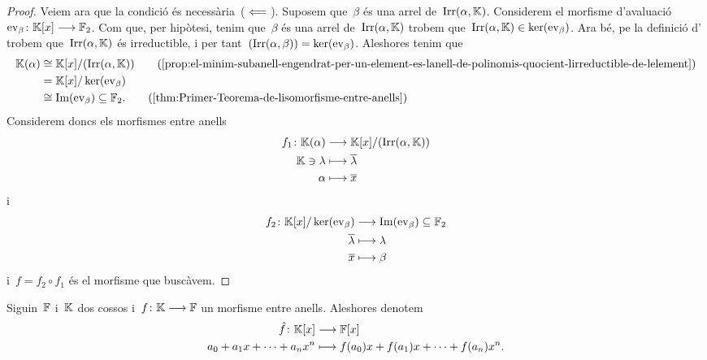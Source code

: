 \documentclass[../teoria-de-Galois.tex]{subfiles}
\begin{document}
\begin{proof}
        Veiem ara que la condició és necessària~(\(\impliedby\)).
        Suposem que~\(\beta\) és una arrel de~\(\operatorname{Irr}(\alpha,\mathbb{K})\).
        Considerem el morfisme d'avaluació~\(\mathrm{ev}_{\beta}\colon\mathbb{K}[x]\longrightarrow\mathbb{F}_{2}\).
        Com que, per hipòtesi, tenim que~\(\beta\) és una arrel de~\(\operatorname{Irr}(\alpha,\mathbb{K})\) trobem que~\(\operatorname{Irr}(\alpha,\mathbb{K})\in\operatorname{ker}(\mathrm{ev}_{\beta})\).
        Ara bé, pe la definició d' trobem que~\(\operatorname{Irr}(\alpha,\mathbb{K})\) és irreductible, i per tant~\((\operatorname{Irr}(\alpha,\beta))=\operatorname{ker}(\mathrm{ev}_{\beta})\).
        Aleshores tenim que
        \begin{align*}
            \KK(\alpha)&\cong\KK[x]/(\Irr(\alpha,\KK)) \tag{\ref{prop:el-minim-subanell-engendrat-per-un-element-es-lanell-de-polinomis-quocient-lirreductible-de-lelement}}\\
            &=\KK[x]/\ker(\ev_{\beta}) \\
            &\cong\Ima(\ev_{\beta})\subseteq\FF_{2}.
            \tag{\ref{thm:Primer-Teorema-de-lisomorfisme-entre-anells}}
        \end{align*}
        Considerem doncs els morfismes entre anells
        \begin{align*}
            f_{1}\colon\mathbb{K}(\alpha)&\longrightarrow\mathbb{K}[x]/(\operatorname{Irr}(\alpha,\mathbb{K})) \\
            \mathbb{K}\ni\lambda&\longmapsto\overline{\lambda} \\
            \alpha&\longmapsto\overline{x}
        \end{align*}
        i
        \begin{align*}
            f_{2}\colon\mathbb{K}[x]/\operatorname{ker}(\mathrm{ev}_{\beta})&\longrightarrow\operatorname{Im}(\mathrm{ev}_{\beta})\subseteq\mathbb{F}_{2} \\
            \overline{\lambda}&\longmapsto\lambda \\
            \overline{x}&\longmapsto\beta
        \end{align*}
        i~\(f=f_{2}\circ f_{1}\) és el morfisme que buscàvem.
    \end{proof}
    \begin{notation}
        Siguin~\(\mathbb{F}\) i~\(\mathbb{K}\) dos cossos i~\(f\colon\mathbb{K}\longrightarrow\mathbb{F}\) un morfisme entre anells.
        Aleshores denotem
        \begin{align*}
            \hat{f}\colon\mathbb{K}[x]&\longrightarrow\mathbb{F}[x] \\
            a_{0}+a_{1}x+\dots+a_{n}x^{n}&\longmapsto f(a_{0})x+f(a_{1})x+\dots+f(a_{n})x^{n}.
        \end{align*}
    \end{notation}
\end{document}
